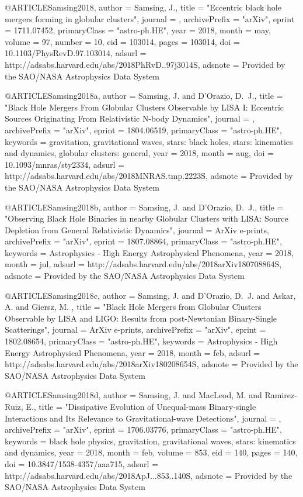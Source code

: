 \documentclass[twocolumn,tighten]{aastex63}
\begin{document}
{{{{{{@ARTICLE{Samsing2018,
   author = {{Samsing}, J.},
    title = "{Eccentric black hole mergers forming in globular clusters}",
  journal = {\prd},
archivePrefix = "arXiv",
   eprint = {1711.07452},
 primaryClass = "astro-ph.HE",
     year = 2018,
    month = may,
   volume = 97,
   number = 10,
      eid = {103014},
    pages = {103014},
      doi = {10.1103/PhysRevD.97.103014},
   adsurl = {http://adsabs.harvard.edu/abs/2018PhRvD..97j3014S},
  adsnote = {Provided by the SAO/NASA Astrophysics Data System}
}

@ARTICLE{Samsing2018a,
   author = {{Samsing}, J. and {D'Orazio}, D.~J.},
    title = "{Black Hole Mergers From Globular Clusters Observable by LISA I: Eccentric Sources Originating From Relativistic N-body Dynamics}",
  journal = {\mnras},
archivePrefix = "arXiv",
   eprint = {1804.06519},
 primaryClass = "astro-ph.HE",
 keywords = {gravitation, gravitational waves, stars: black holes, stars: kinematics and dynamics, globular clusters: general},
     year = 2018,
    month = aug,
      doi = {10.1093/mnras/sty2334},
   adsurl = {http://adsabs.harvard.edu/abs/2018MNRAS.tmp.2223S},
  adsnote = {Provided by the SAO/NASA Astrophysics Data System}
}

@ARTICLE{Samsing2018b,
   author = {{Samsing}, J. and {D'Orazio}, D.~J.},
    title = "{Observing Black Hole Binaries in nearby Globular Clusters with LISA: Source Depletion from General Relativistic Dynamics}",
  journal = {ArXiv e-prints},
archivePrefix = "arXiv",
   eprint = {1807.08864},
 primaryClass = "astro-ph.HE",
 keywords = {Astrophysics - High Energy Astrophysical Phenomena},
     year = 2018,
    month = jul,
   adsurl = {http://adsabs.harvard.edu/abs/2018arXiv180708864S},
  adsnote = {Provided by the SAO/NASA Astrophysics Data System}
}

@ARTICLE{Samsing2018c,
   author = {{Samsing}, J. and {D'Orazio}, D.~J. and {Askar}, A. and {Giersz}, M.
	},
    title = "{Black Hole Mergers from Globular Clusters Observable by LISA and LIGO: Results from post-Newtonian Binary-Single Scatterings}",
  journal = {ArXiv e-prints},
archivePrefix = "arXiv",
   eprint = {1802.08654},
 primaryClass = "astro-ph.HE",
 keywords = {Astrophysics - High Energy Astrophysical Phenomena},
     year = 2018,
    month = feb,
   adsurl = {http://adsabs.harvard.edu/abs/2018arXiv180208654S},
  adsnote = {Provided by the SAO/NASA Astrophysics Data System}
}

@ARTICLE{Samsing2018d,
   author = {{Samsing}, J. and {MacLeod}, M. and {Ramirez-Ruiz}, E.},
    title = "{Dissipative Evolution of Unequal-mass Binary-single Interactions and Its Relevance to Gravitational-wave Detections}",
  journal = {\apj},
archivePrefix = "arXiv",
   eprint = {1706.03776},
 primaryClass = "astro-ph.HE",
 keywords = {black hole physics, gravitation, gravitational waves, stars: kinematics and dynamics},
     year = 2018,
    month = feb,
   volume = 853,
      eid = {140},
    pages = {140},
      doi = {10.3847/1538-4357/aaa715},
   adsurl = {http://adsabs.harvard.edu/abs/2018ApJ...853..140S},
  adsnote = {Provided by the SAO/NASA Astrophysics Data System}
}

}}}}}}
\end{document}
